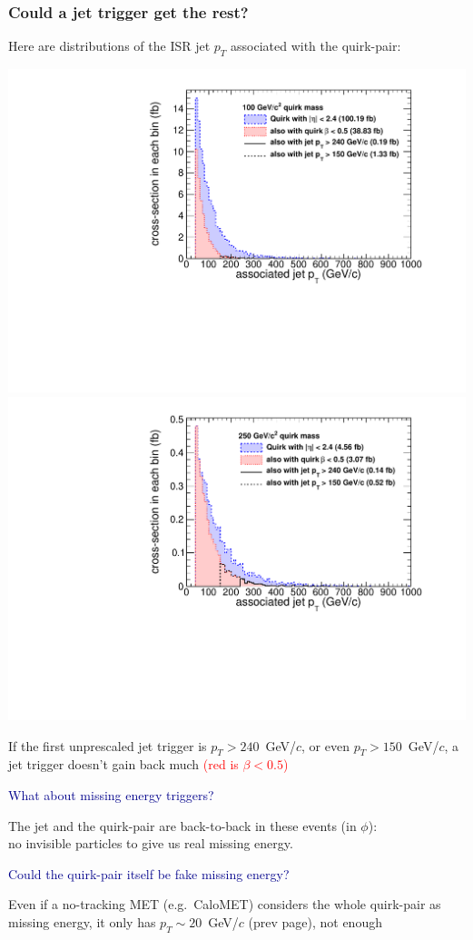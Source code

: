 \documentclass[compress]{beamer}
\begin{document}
\begin{frame}
\frametitle{Could a jet trigger get the rest?}

Here are distributions of the ISR jet $p_T$ associated with the quirk-pair:

\includegraphics[width=0.5\linewidth]{jettrigger_100gev.pdf}
\includegraphics[width=0.5\linewidth]{jettrigger_250gev.pdf}

If the first unprescaled jet trigger is $p_T > 240$~GeV/$c$, or even $p_T > 150$~GeV/$c$, a jet trigger doesn't gain back much \textcolor{red}{(red is $\beta < 0.5$)}

\vspace{0.2 cm}
\hspace{-0.83 cm} \textcolor{darkblue}{\Large What about missing energy triggers?}

\vspace{0.1 cm}
The jet and the quirk-pair are back-to-back in these events (in $\phi$): \\ no invisible particles to give us real missing energy.

\vspace{0.2 cm}
\hspace{-0.83 cm} \textcolor{darkblue}{\Large Could the quirk-pair itself be fake missing energy?}

\vspace{0.1 cm}
Even if a no-tracking MET (e.g.\ CaloMET) considers the whole quirk-pair as missing energy, it only has $p_T \sim 20$~GeV/$c$ (prev page), not enough
\end{frame}
\end{document}
